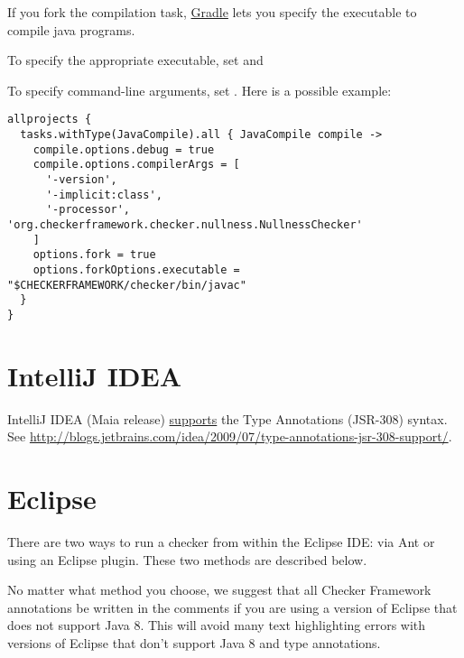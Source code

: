 If you fork the compilation task, \href{http://gradle.org/}{Gradle}
lets you specify the executable to compile java programs.

To specify the appropriate executable, set
 and

To specify command-line arguments, set
.  Here is a possible example:

\begin{Verbatim}
allprojects {
  tasks.withType(JavaCompile).all { JavaCompile compile ->
    compile.options.debug = true
    compile.options.compilerArgs = [
      '-version',
      '-implicit:class',
      '-processor', 'org.checkerframework.checker.nullness.NullnessChecker'
    ]
    options.fork = true
    options.forkOptions.executable = "$CHECKERFRAMEWORK/checker/bin/javac"
  }
}
\end{Verbatim}



\section{IntelliJ IDEA\label{intellij}}

IntelliJ IDEA (Maia release)
\href{http://blogs.jetbrains.com/idea/2009/07/type-annotations-jsr-308-support/}{supports}
the Type Annotations (JSR-308) syntax.
See \url{http://blogs.jetbrains.com/idea/2009/07/type-annotations-jsr-308-support/}.

\section{Eclipse\label{eclipse}}


There are two ways to run a checker from within the Eclipse IDE:  via Ant
or using an Eclipse plugin.  These two methods are described below.

No matter what method you choose, we suggest that
all Checker Framework annotations be written in the comments
if you are using a version of Eclipse that
does not support Java 8.  This will avoid many
text highlighting errors with versions of Eclipse that don't support Java 8
and type annotations.

